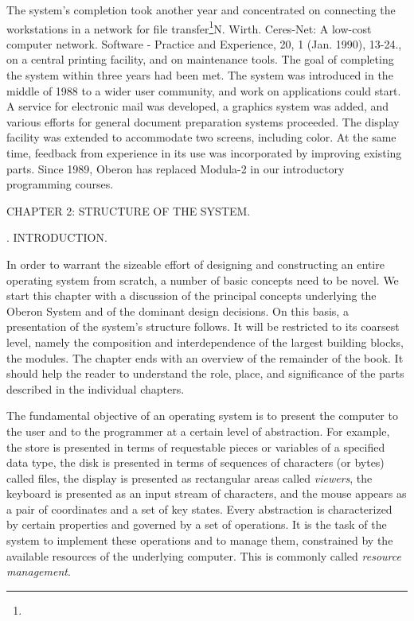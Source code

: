The system's completion took another year and concentrated on
connecting the workstations in a network for file transfer\footnote{{\mc[4]}}{N. Wirth. Ceres-Net: A low-cost computer network. Software - Practice and Experience, 20, 1 (Jan. 1990), 13-24.}, on a
central printing facility, and on maintenance tools. The goal of
completing the system within three years had been met. The system was
introduced in the middle of 1988 to a wider user community, and work
on applications could start. A service for electronic mail was
developed, a graphics system was added, and various efforts for
general document preparation systems proceeded. The display facility
was extended to accommodate two screens, including color. At the same
time, feedback from experience in its use was incorporated by
improving existing parts. Since 1989, Oberon has replaced Modula-2 in
our introductory programming courses.

\beginchapter CHAPTER 2: STRUCTURE OF THE SYSTEM.

\medskip

. INTRODUCTION.

In order to warrant the sizeable effort of designing and constructing
an entire operating system from scratch, a number of basic concepts
need to be novel. %
We start this chapter with a discussion of the
principal concepts underlying the Oberon System and of the dominant
design decisions. On this basis, a presentation of the system's
structure follows. It will be restricted to its coarsest level, namely
the composition and interdependence of the largest building blocks,
the modules. The chapter ends with an overview of the remainder of the
book. It should help the reader to understand the role, place, and
significance of the parts described in the individual chapters.

The fundamental objective of an operating system is to present the
computer to the user and to the programmer at a certain level of
abstraction. For example, the store is presented in terms of
requestable pieces or variables of a specified data type, the disk is
presented in terms of sequences of characters (or bytes) called files,
the display is presented as rectangular areas called \emph{viewers}, the
keyboard is presented as an input stream of characters, and the mouse
appears as a pair of coordinates and a set of key states. Every
abstraction is characterized by certain properties and governed by a
set of operations. It is the task of the system to implement these
operations and to manage them, constrained by the available resources
of the underlying computer. This is commonly called \emph{resource management}.


